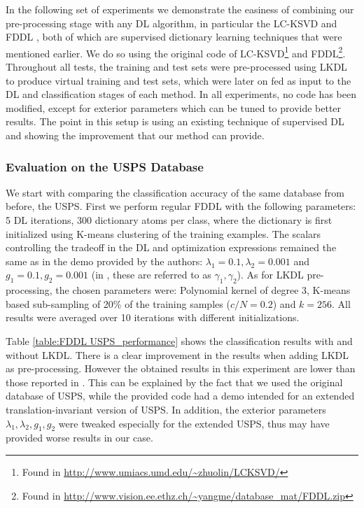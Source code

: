 \documentclass[journal]{IEEEtran}
\begin{document}
In the following set of experiments we demonstrate the easiness of combining our pre-processing stage with any DL algorithm, in particular the LC-KSVD \cite{LCKSVD} and FDDL \cite{FDDL}, both of which are supervised dictionary learning techniques that were mentioned earlier. We do so using the original code of LC-KSVD\footnote{Found in \url{http://www.umiacs.umd.edu/~zhuolin/LCKSVD/}} and FDDL\footnote{Found in \url{http://www.vision.ee.ethz.ch/~yangme/database_mat/FDDL.zip}}.
Throughout all tests, the training and test sets were pre-processed using LKDL to produce virtual training and test sets, which were later on fed as input to the DL and classification stages of each method. In all experiments, no code has been modified, except for exterior parameters which can be tuned to provide better results. The point in this setup is using an existing technique of supervised DL and showing the improvement that our method can provide.

\subsubsection{Evaluation on the USPS Database}

We start with comparing the classification accuracy of the same database from before, the USPS. First we perform regular FDDL with the following parameters: 5 DL iterations, 300 dictionary atoms per class, where the dictionary is first initialized using K-means clustering of the training examples. The scalars controlling the tradeoff in the DL and optimization expressions remained the same as in the demo provided by the authors: $\lambda_1=0.1,\lambda_2=0.001$ and $g_1=0.1,g_2=0.001$ (in \cite{FDDL}, these are referred to as $\gamma_1,\gamma_2$). As for LKDL pre-processing, the chosen parameters were: Polynomial kernel of degree 3, K-means based sub-sampling of 20\% of the training samples ($c/N=0.2$) and $k=256$. All results were averaged over 10 iterations with different initializations.

Table \ref{table:FDDL USPS_performance} shows the classification results with and without LKDL. There is a clear improvement in the results when adding LKDL as pre-processing. However the obtained results in this experiment are lower than those reported in \cite{FDDL}. This can be explained by the fact that we used the original database of USPS, while the provided code had a demo intended for an extended translation-invariant version of USPS. In addition, the exterior parameters $\lambda_1,\lambda_2,g_1,g_2$ were tweaked especially for the extended USPS, thus may have provided worse results in our case.
\end{document}
